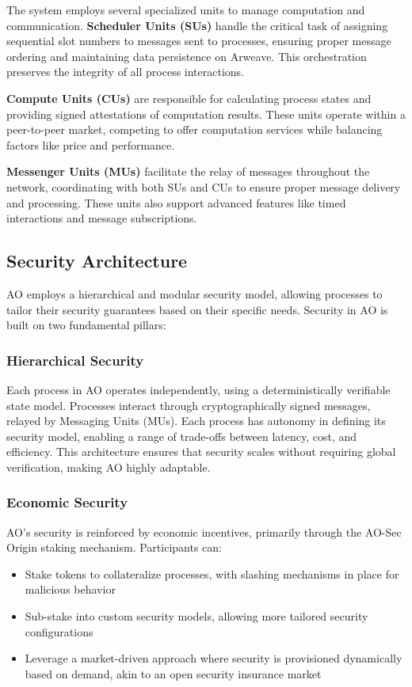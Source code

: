 The system employs several specialized units to manage computation and communication. \textbf{Scheduler Units (SUs)} handle the critical task of assigning sequential slot numbers to messages sent to processes, ensuring proper message ordering and maintaining data persistence on Arweave. This orchestration preserves the integrity of all process interactions.

\textbf{Compute Units (CUs)} are responsible for calculating process states and providing signed attestations of computation results. These units operate within a peer-to-peer market, competing to offer computation services while balancing factors like price and performance.

\textbf{Messenger Units (MUs)} facilitate the relay of messages throughout the network, coordinating with both SUs and CUs to ensure proper message delivery and processing. These units also support advanced features like timed interactions and message subscriptions.

\subsection{Security Architecture}

AO employs a hierarchical and modular security model, allowing processes to tailor their security guarantees based on their specific needs. Security in AO is built on two fundamental pillars:

\subsubsection{Hierarchical Security}
Each process in AO operates independently, using a deterministically verifiable state model. Processes interact through cryptographically signed messages, relayed by Messaging Units (MUs). Each process has autonomy in defining its security model, enabling a range of trade-offs between latency, cost, and efficiency. This architecture ensures that security scales without requiring global verification, making AO highly adaptable.

\subsubsection{Economic Security}
AO's security is reinforced by economic incentives, primarily through the AO-Sec Origin staking mechanism. Participants can:
\begin{itemize}
\item Stake tokens to collateralize processes, with slashing mechanisms in place for malicious behavior
\item Sub-stake into custom security models, allowing more tailored security configurations
\item Leverage a market-driven approach where security is provisioned dynamically based on demand, akin to an open security insurance market
\end{itemize}


